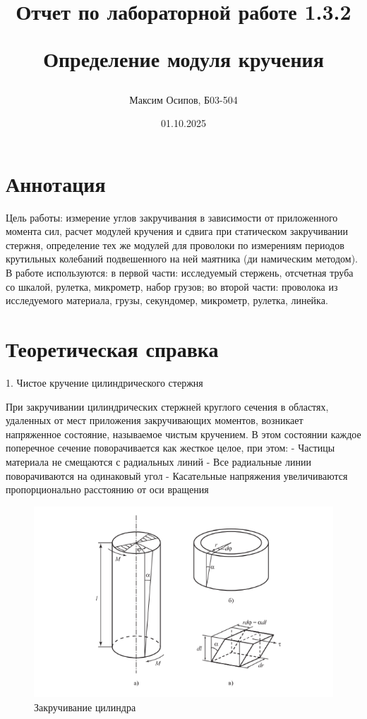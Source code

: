 \documentclass[a4paper, 12pt]{article}
\title{Отчет по лабораторной работе 1.3.2

Определение модуля кручения}
\author{Максим Осипов, Б03-504}
\date{01.10.2025}
\begin{document}
\maketitle
\newpage

\section{Аннотация}
 Цель работы: измерение углов закручивания в зависимости от приложенного момента сил, расчет
 модулей кручения и сдвига при статическом закручивании стержня, определение тех же модулей
 для проволоки по измерениям периодов крутильных колебаний подвешенного на ней маятника (ди
намическим методом).\\
\indent
 В работе используются: в первой части: исследуемый стержень, отсчетная труба со шкалой,
 рулетка, микрометр, набор грузов; во второй части: проволока из исследуемого материала, грузы,
 секундомер, микрометр, рулетка, линейка.

\section{Теоретическая справка}

1. Чистое кручение цилиндрического стержня

При закручивании цилиндрических стержней круглого сечения в областях, удаленных от мест приложения закручивающих моментов, возникает напряженное состояние, называемое чистым кручением. В этом состоянии каждое поперечное сечение поворачивается как жесткое целое, при этом:
- Частицы материала не смещаются с радиальных линий
- Все радиальные линии поворачиваются на одинаковый угол
- Касательные напряжения увеличиваются пропорционально расстоянию от оси вращения

\begin{figure}[h]
\centering
\includegraphics[width=0.8\linewidth]{рис 1.png}
\caption{Закручивание цилиндра}
\label{fig:voltage_current}
\end{figure}
\end{document}
